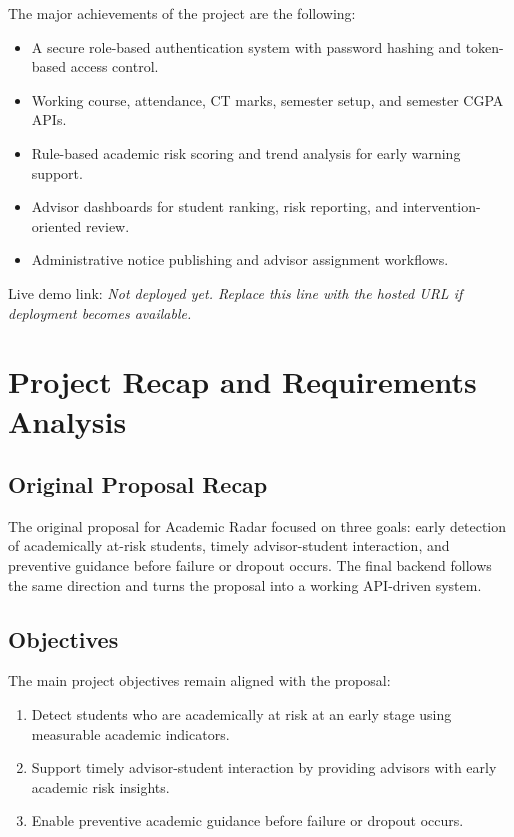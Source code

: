 \documentclass[12pt,a4paper]{article}
\begin{document}
The major achievements of the project are the following:
\begin{itemize}[leftmargin=*]
  \item A secure role-based authentication system with password hashing and token-based access control.
  \item Working course, attendance, CT marks, semester setup, and semester CGPA APIs.
  \item Rule-based academic risk scoring and trend analysis for early warning support.
  \item Advisor dashboards for student ranking, risk reporting, and intervention-oriented review.
  \item Administrative notice publishing and advisor assignment workflows.
\end{itemize}

Live demo link: \textit{Not deployed yet. Replace this line with the hosted URL if deployment becomes available.}

\section{Project Recap and Requirements Analysis}
\subsection{Original Proposal Recap}
The original proposal for Academic Radar focused on three goals: early detection of academically at-risk students, timely advisor-student interaction, and preventive guidance before failure or dropout occurs. The final backend follows the same direction and turns the proposal into a working API-driven system.

\subsection{Objectives}
The main project objectives remain aligned with the proposal:
\begin{enumerate}[leftmargin=*]
  \item Detect students who are academically at risk at an early stage using measurable academic indicators.
  \item Support timely advisor-student interaction by providing advisors with early academic risk insights.
  \item Enable preventive academic guidance before failure or dropout occurs.
\end{enumerate}
\end{document}
